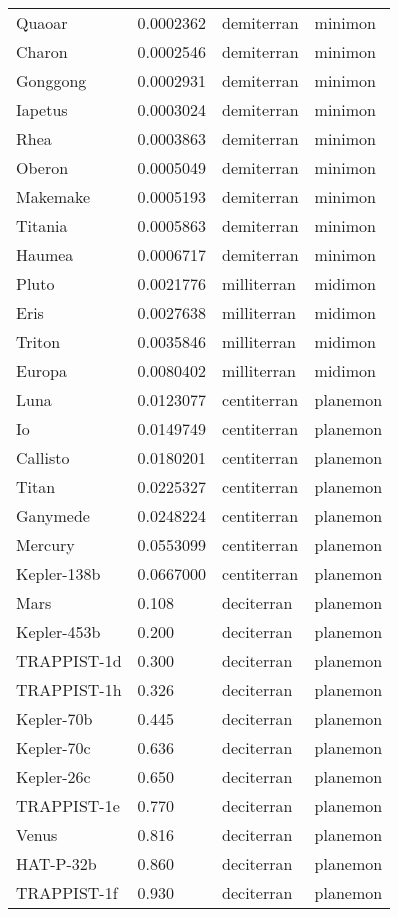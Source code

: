 \documentclass[
  letterpaper,
]{book}
\begin{document}
\begin{longtable}[]{@{}llll@{}}
Quaoar & 0.0002362 & demiterran & minimon \\
Charon & 0.0002546 & demiterran & minimon \\
Gonggong & 0.0002931 & demiterran & minimon \\
Iapetus & 0.0003024 & demiterran & minimon \\
Rhea & 0.0003863 & demiterran & minimon \\
Oberon & 0.0005049 & demiterran & minimon \\
Makemake & 0.0005193 & demiterran & minimon \\
Titania & 0.0005863 & demiterran & minimon \\
Haumea & 0.0006717 & demiterran & minimon \\
Pluto & 0.0021776 & milliterran & midimon \\
Eris & 0.0027638 & milliterran & midimon \\
Triton & 0.0035846 & milliterran & midimon \\
Europa & 0.0080402 & milliterran & midimon \\
Luna & 0.0123077 & centiterran & planemon \\
Io & 0.0149749 & centiterran & planemon \\
Callisto & 0.0180201 & centiterran & planemon \\
Titan & 0.0225327 & centiterran & planemon \\
Ganymede & 0.0248224 & centiterran & planemon \\
Mercury & 0.0553099 & centiterran & planemon \\
Kepler-138b & 0.0667000 & centiterran & planemon \\
Mars & 0.108 & deciterran & planemon \\
Kepler-453b & 0.200 & deciterran & planemon \\
TRAPPIST-1d & 0.300 & deciterran & planemon \\
TRAPPIST-1h & 0.326 & deciterran & planemon \\
Kepler-70b & 0.445 & deciterran & planemon \\
Kepler-70c & 0.636 & deciterran & planemon \\
Kepler-26c & 0.650 & deciterran & planemon \\
TRAPPIST-1e & 0.770 & deciterran & planemon \\
Venus & 0.816 & deciterran & planemon \\
HAT-P-32b & 0.860 & deciterran & planemon \\
TRAPPIST-1f & 0.930 & deciterran & planemon \\

\end{longtable}
\end{document}
